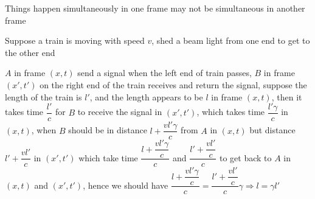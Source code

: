 \documentclass[main]{subfiles}
\begin{document}
Things happen simultaneously in one frame may not be simultaneous in another frame

\begin{deduction}
Suppose a train is moving with speed $v$, shed a beam light from one end to get to the other end

$A$ in frame $(x,t)$ send a signal when the left end of train passes, $B$ in frame $(x',t')$ on the right end of the train receives and return the signal, suppose the length of the train is $l'$, and the length appears to be $l$ in frame $(x,t)$, then it takes time $\dfrac{l'}{c}$ for $B$ to receive the signal in $(x',t')$, which takes time $\dfrac{l'\gamma}{c}$ in $(x,t)$, when $B$ should be in distance $l+\dfrac{vl'\gamma}{c}$ from $A$ in $(x,t)$ but distance $l'+\dfrac{vl'}{c}$ in $(x',t')$ which take time $\dfrac{l+\dfrac{vl'\gamma}{c}}{c}$ and $\dfrac{l'+\dfrac{vl'}{c}}{c}$ to get back to $A$ in $(x,t)$ and $(x',t')$, hence we should have  $\dfrac{l+\dfrac{vl'\gamma}{c}}{c}=\dfrac{l'+\dfrac{vl'}{c}}{c}\gamma\Rightarrow l=\gamma l'$
\end{deduction}
\end{document}
